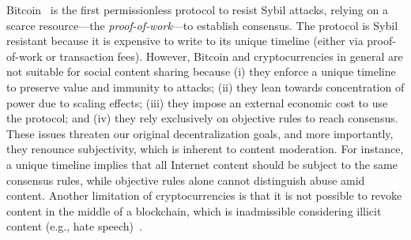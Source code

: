 \documentclass[12pt]{article}
\begin{document}
Bitcoin~\cite{p2p.bitcoin} is the first permissionless protocol to resist
Sybil attacks, relying on a scarce resource---the \emph{proof-of-work}---to
establish consensus.
The protocol is Sybil resistant because it is expensive to write to its
unique timeline (either via proof-of-work or transaction fees).
%
However, Bitcoin and cryptocurrencies in general are not suitable for social
content sharing because
    (i)   they enforce a unique timeline to preserve value and immunity to
          attacks;
    (ii)  they lean towards concentration of power due to scaling effects;
    (iii) they impose an external economic cost to use the protocol; and
    (iv)  they rely exclusively on objective rules to reach consensus.
%
These issues threaten our original decentralization goals, and more
importantly, they renounce subjectivity, which is inherent to content
moderation.
%
For instance, a unique timeline implies that all Internet content should be
subject to the same consensus rules, while objective rules alone cannot
distinguish abuse amid content.
%
Another limitation of cryptocurrencies is that it is not possible to revoke
content in the middle of a blockchain, which is inadmissible considering
illicit content (e.g., hate speech)~\cite{btc.content}.
\end{document}
